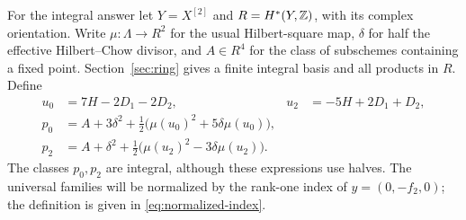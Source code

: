 For the integral answer let $Y=X^{[2]}$ and $R=H^*(Y,\mathbb Z)$, with its
complex orientation. Write $\mu:\Lambda\to R^2$ for the usual
Hilbert-square map, $\delta$ for half the effective Hilbert--Chow
divisor, and $A\in R^4$ for the class of subschemes containing a fixed
point. Section~\ref{sec:ring} gives a finite integral basis and all
products in $R$. Define
\begin{equation}\label{eq:planes-intro}
 \begin{aligned}
 u_0&=7H-2D_1-2D_2,& u_2&=-5H+2D_1+D_2,\\
 p_0&=A+3\delta^2+\tfrac12\bigl(\mu(u_0)^2+5\delta\mu(u_0)\bigr),\\
 p_2&=A+\delta^2+\tfrac12\bigl(\mu(u_2)^2-3\delta\mu(u_2)\bigr).
 \end{aligned}
\end{equation}
The classes $p_0,p_2$ are integral, although these expressions use halves.
The universal families will be normalized by the rank-one index of
$y=(0,-f_2,0)$; the definition is given in
\eqref{eq:normalized-index}.

